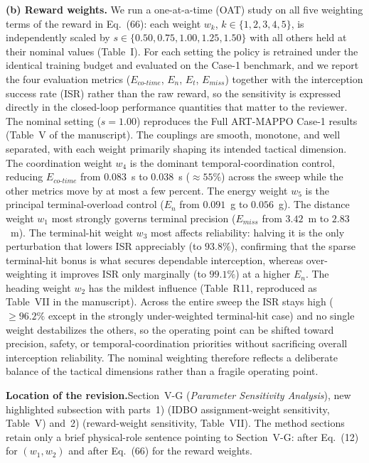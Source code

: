 \documentclass[11pt]{article}
\newcommand{\loc}{\medskip\noindent\textbf{Location of the revision.}\quad}
\begin{document}
\textbf{(b) Reward weights.} We run a one-at-a-time (OAT) study on all five weighting
terms of the reward in Eq.~(66): each weight $w_k$, $k\in\{1,2,3,4,5\}$, is independently
scaled by $s\in\{0.50,0.75,1.00,1.25,1.50\}$ with all others held at their nominal values
(Table~I). For each setting the policy is retrained under the identical training budget
and evaluated on the Case-1 benchmark, and we report the four evaluation metrics
($E_{co\text{-}time}$, $E_n$, $E_t$, $E_{miss}$) together with the interception success
rate (ISR) rather than the raw reward, so the sensitivity is expressed directly in the
closed-loop performance quantities that matter to the reviewer. The nominal setting
($s{=}1.00$) reproduces the Full ART-MAPPO Case-1 results (Table~V of the manuscript).
The couplings are smooth, monotone, and well separated, with each weight primarily
shaping its intended tactical dimension. The coordination weight $w_4$ is the dominant
temporal-coordination control, reducing $E_{co\text{-}time}$ from $0.083$~s to $0.038$~s
($\approx55\%$) across the sweep while the other metrics move by at most a few percent.
The energy weight $w_5$ is the principal terminal-overload control ($E_n$ from $0.091$~g
to $0.056$~g). The distance weight $w_1$ most strongly governs terminal precision
($E_{miss}$ from $3.42$~m to $2.83$~m). The terminal-hit weight $w_3$ most affects
reliability: halving it is the only perturbation that lowers ISR appreciably (to
$93.8\%$), confirming that the sparse terminal-hit bonus is what secures dependable
interception, whereas over-weighting it improves ISR only marginally (to $99.1\%$) at a
higher $E_n$. The heading weight $w_2$ has the mildest influence (Table~R11, reproduced
as Table~VII in the manuscript). Across the entire sweep the ISR stays high
($\geq96.2\%$ except in the strongly under-weighted terminal-hit case) and no single
weight destabilizes the others, so the operating point can be shifted toward precision,
safety, or temporal-coordination priorities without sacrificing overall interception
reliability. The nominal weighting therefore reflects a deliberate balance of the
tactical dimensions rather than a fragile operating point.

\loc Section~V-G (\emph{Parameter Sensitivity Analysis}), new highlighted subsection with
parts~1) (IDBO assignment-weight sensitivity, Table~V) and~2) (reward-weight sensitivity,
Table~VII). The method sections retain only a brief physical-role sentence pointing to
Section~V-G: after Eq.~(12) for $(w_1,w_2)$ and after Eq.~(66) for the reward weights.
\end{document}
